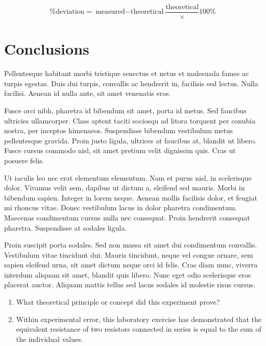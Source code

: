 \documentclass{article}
\begin{document}
\[\text{\%deviation} = {\text{measured} - \text{theoretical}} \frac {\text{theoretical}} \times \text{100\%}\]

    \section{Conclusions}
    Pellentesque habitant morbi tristique senectus et netus et malesuada fames ac
    turpis egestas. Duis dui turpis, convallis ac hendrerit in, facilisis sed
    lectus. Nulla facilisi. Aenean id nulla ante, sit amet venenatis eros.

    Fusce orci nibh, pharetra id bibendum sit amet, porta id metus. Sed faucibus
    ultricies ullamcorper. Class aptent taciti sociosqu ad litora torquent per
    conubia nostra, per inceptos himenaeos. Suspendisse bibendum vestibulum metus
    pellentesque gravida. Proin justo ligula, ultrices at faucibus at, blandit ut
    libero. Fusce cursus commodo nisl, sit amet pretium velit dignissim quis. Cras
    ut posuere felis.

    Ut iaculis leo nec erat elementum elementum. Nam et purus nisl, in scelerisque
    dolor. Vivamus velit sem, dapibus ut dictum a, eleifend sed mauris. Morbi in
    bibendum sapien. Integer in lorem neque. Aenean mollis facilisis dolor, et
    feugiat mi rhoncus vitae. Donec vestibulum lacus in dolor pharetra condimentum.
    Maecenas condimentum cursus nulla nec consequat. Proin hendrerit consequat
    pharetra. Suspendisse at sodales ligula.

    Proin suscipit porta sodales. Sed non massa sit amet dui condimentum convallis.
    Vestibulum vitae tincidunt dui. Mauris tincidunt, neque vel congue ornare, sem
    sapien eleifend urna, sit amet dictum neque orci id felis. Cras diam nunc,
    viverra interdum aliquam sit amet, blandit quis libero. Nunc eget odio
    scelerisque eros placerat auctor. Aliquam mattis tellus sed lacus sodales id
    molestie risus cursus.
\begin{enumerate}{}
\item What theoretical principle or concept did this experiment prove?
\item Within experimental error, this laboratory exercise has demonstrated that
the equivalent resistance of two resistors connected in series is equal to the
sum of the individual values.
\end{enumerate}
    
\end{document}
